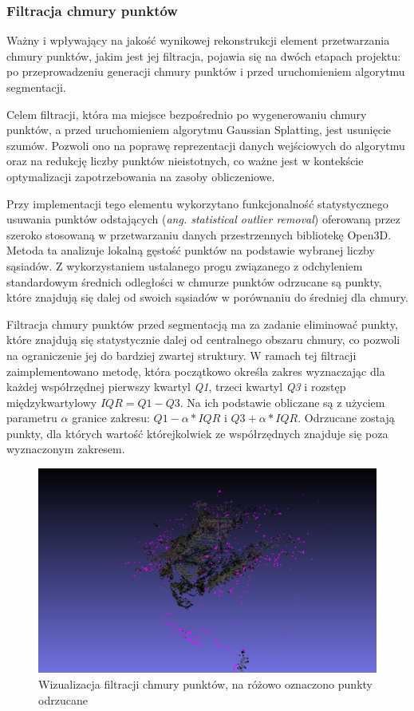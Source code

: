 \subsubsection{Filtracja chmury punktów}
Ważny i wpływający na jakość wynikowej rekonstrukcji element przetwarzania chmury punktów, jakim jest jej filtracja, pojawia się na dwóch etapach projektu: po przeprowadzeniu generacji chmury punktów i przed uruchomieniem algorytmu segmentacji. 

Celem filtracji, która ma miejsce bezpośrednio po wygenerowaniu chmury punktów, a przed uruchomieniem algorytmu Gaussian Splatting, jest usunięcie szumów. Pozwoli ono na poprawę reprezentacji danych wejściowych do algorytmu oraz na redukcję liczby punktów nieistotnych, co ważne jest w kontekście optymalizacji zapotrzebowania na zasoby obliczeniowe.

Przy implementacji tego elementu wykorzytano funkcjonalność statystycznego usuwania punktów odstających (\textit{ang. statistical outlier removal}) oferowaną przez szeroko stosowaną w przetwarzaniu danych przestrzennych bibliotekę Open3D\cite{Zhou2018}. Metoda ta analizuje lokalną gęstość punktów na podstawie wybranej liczby sąsiadów. Z wykorzystaniem ustalanego progu związanego z odchyleniem standardowym średnich odległości w chmurze punktów odrzucane są punkty, które znajdują się dalej od swoich sąsiadów w porównaniu do średniej dla chmury. 

Filtracja chmury punktów przed segmentacją ma za zadanie eliminować punkty, które znajdują się 
statystycznie dalej od centralnego obszaru chmury, co pozwoli na ograniczenie jej do bardziej zwartej struktury. W ramach tej filtracji zaimplementowano metodę\cite{raviteja2023outliers}, która początkowo określa zakres wyznaczając dla każdej współrzędnej pierwszy kwartyl \textit{Q1}, trzeci kwartyl \textit{Q3} i rozstęp międzykwartylowy $IQR = Q1 - Q3$. Na ich podstawie obliczane są z użyciem parametru $\alpha$ granice zakresu: $Q1 - \alpha * IQR$ i $Q3 + \alpha * IQR$. Odrzucane zostają punkty, dla których wartość którejkolwiek ze współrzędnych znajduje się poza wyznaczonym zakresem.

\begin{figure}[!ht]
  \includegraphics[width=\linewidth]{img/filtering.png}
  \caption{Wizualizacja filtracji chmury punktów, na różowo oznaczono punkty odrzucane}
  \label{fig:filtering}
\end{figure}